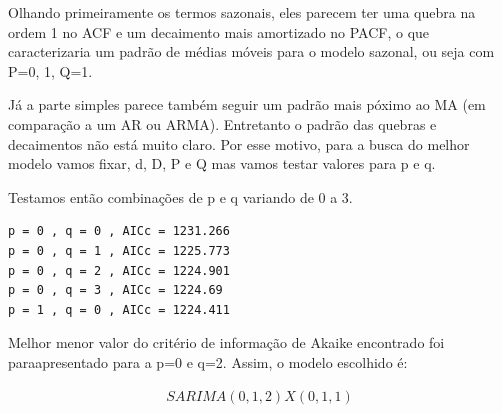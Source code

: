 \documentclass[
  letterpaper,
  DIV=11,
  numbers=noendperiod]{scrartcl}
\newenvironment{Shaded}{\begin{snugshade}}{\end{snugshade}}
\newcommand{\AttributeTok}[1]{\textcolor[rgb]{0.40,0.45,0.13}{#1}}
\newcommand{\ConstantTok}[1]{\textcolor[rgb]{0.56,0.35,0.01}{#1}}
\newcommand{\ControlFlowTok}[1]{\textcolor[rgb]{0.00,0.23,0.31}{#1}}
\newcommand{\DecValTok}[1]{\textcolor[rgb]{0.68,0.00,0.00}{#1}}
\newcommand{\FunctionTok}[1]{\textcolor[rgb]{0.28,0.35,0.67}{#1}}
\newcommand{\NormalTok}[1]{\textcolor[rgb]{0.00,0.23,0.31}{#1}}
\newcommand{\OtherTok}[1]{\textcolor[rgb]{0.00,0.23,0.31}{#1}}
\newcommand{\SpecialCharTok}[1]{\textcolor[rgb]{0.37,0.37,0.37}{#1}}
\newcommand{\StringTok}[1]{\textcolor[rgb]{0.13,0.47,0.30}{#1}}
\begin{document}
Olhando primeiramente os termos sazonais, eles parecem ter uma quebra na
ordem 1 no ACF e um decaimento mais amortizado no PACF, o que
caracterizaria um padrão de médias móveis para o modelo sazonal, ou seja
com P=0, 1, Q=1.

Já a parte simples parece também seguir um padrão mais póximo ao MA (em
comparação a um AR ou ARMA). Entretanto o padrão das quebras e
decaimentos não está muito claro. Por esse motivo, para a busca do
melhor modelo vamos fixar, d, D, P e Q mas vamos testar valores para p e
q.

Testamos então combinações de p e q variando de 0 a 3.

\begin{Shaded}
\end{Shaded}

\begin{verbatim}
p = 0 , q = 0 , AICc = 1231.266 
p = 0 , q = 1 , AICc = 1225.773 
p = 0 , q = 2 , AICc = 1224.901 
p = 0 , q = 3 , AICc = 1224.69 
p = 1 , q = 0 , AICc = 1224.411 
\end{verbatim}

Melhor menor valor do critério de informação de Akaike encontrado foi
paraapresentado para a p=0 e q=2. Assim, o modelo escolhido é:

\begin{align*}
  SARIMA (0, 1, 2) X (0, 1, 1)
\end{align*}
\end{document}
